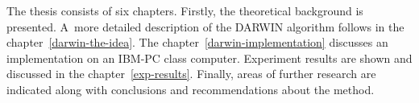 The thesis consists of six chapters. Firstly, the theoretical background is
presented. A~more detailed description of the DARWIN algorithm follows in the
chapter~\ref{darwin-the-idea}. The chapter~\ref{darwin-implementation}
discusses an implementation on an IBM-PC class computer. Experiment results
are shown and discussed in the chapter~\ref{exp-results}. Finally, areas of
further research are indicated along with conclusions and recommendations
about the method.
